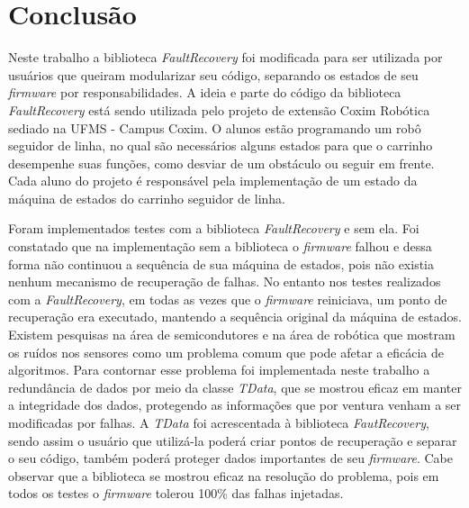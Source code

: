 
\chapter{Conclusão} \label{cap:conclusao}

Neste trabalho a biblioteca \textit{FaultRecovery} foi modificada para ser utilizada por usuários que queiram modularizar seu código, separando os estados de seu \textit{firmware} por responsabilidades. A ideia e parte do código da biblioteca \textit{FaultRecovery} está sendo utilizada pelo projeto de extensão Coxim Robótica sediado na UFMS - Campus Coxim. O alunos estão programando um robô seguidor de linha, no qual são necessários alguns estados para que o carrinho desempenhe suas funções, como desviar de um obstáculo ou seguir em frente. Cada aluno do projeto é responsável pela implementação de um estado da máquina de estados do carrinho seguidor de linha.  

Foram implementados testes com a biblioteca \textit{FaultRecovery} e sem ela. Foi constatado que na implementação sem a biblioteca o \textit{firmware} falhou e dessa forma não continuou a sequência de sua máquina de estados, pois não existia nenhum mecanismo de recuperação de falhas. No entanto nos testes realizados com a \textit{FaultRecovery}, em todas as vezes que o \textit{firmware} reiniciava, um ponto de recuperação era executado, mantendo a sequência original da máquina de estados. Existem pesquisas na área de semicondutores e na área de robótica que mostram os ruídos nos sensores como um problema comum que pode afetar a eficácia de algoritmos. Para contornar esse problema foi implementada neste trabalho a redundância de dados por meio da classe \textit{TData}, que se mostrou eficaz em manter a integridade dos dados, protegendo as informações que por ventura venham a ser modificadas por falhas. A \textit{TData} foi acrescentada à biblioteca \textit{FautRecovery}, sendo assim o usuário que utilizá-la poderá criar pontos de recuperação e separar o seu código, também poderá proteger dados importantes de seu \textit{firmware}. Cabe observar que a biblioteca se mostrou eficaz na resolução do problema, pois em todos os testes o \textit{firmware} tolerou 100\% das falhas injetadas.

